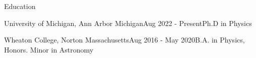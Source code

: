 \documentclass{resume} %
\begin{document}
\begin{rSection}{Education}
    \begin{rSubsection}
        {University of Michigan, Ann Arbor Michigan}{Aug 2022 - Present}{Ph.D in Physics}{}
        
    \end{rSubsection}

\begin{rSubsection}
    {Wheaton College, Norton Massachusetts}{Aug 2016 - May 2020}{B.A. in Physics, Honors. Minor in Astronomy}{}
\end{rSubsection}


\end{rSection}
\end{document}
